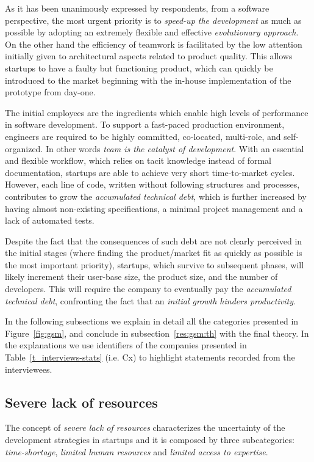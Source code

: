 \documentclass[10pt,journal,letterpaper,compsoc]{IEEEtran}
\begin{document}
As it has been unanimously expressed by respondents, from a software
perspective, the most urgent priority is to \textit{speed-up the development} as
much as possible by adopting an extremely flexible and effective
\textit{evolutionary approach}. On the other hand the efficiency of teamwork is
facilitated by the low attention initially given to architectural aspects
related to product quality. This allows startups to have a faulty but
functioning product, which can quickly be introduced to the market beginning
with the in-house implementation of the prototype from day-one.

The initial employees are the ingredients which enable high levels of
performance in software development. To support a fast-paced production
environment, engineers are required to be highly committed, co-located, 
multi-role, and self-organized. In other words \textit{team is the catalyst of
development}. With an essential and flexible workflow, which relies on tacit
knowledge instead of formal documentation, startups are able to achieve very
short time-to-market cycles. However, each line of code, written without
following structures and processes, contributes to grow the \textit{accumulated
technical debt}, which is further increased by having almost non-existing
specifications, a minimal project management and a lack of automated tests.

Despite the fact that the consequences of such debt are not clearly perceived
in the initial stages (where finding the product/market fit as quickly as
possible is the most important priority), startups, which survive to subsequent
phases, will likely increment their user-base size, the product size, and the
number of developers. This will require the company to eventually pay the
\textit{accumulated technical debt}, confronting the fact that an
\textit{initial growth hinders productivity}.

In the following subsections we explain in detail all the categories presented
in Figure~\ref{fig:gsm}, and conclude in subsection~\ref{res:gsm:th} with the
final theory. In the explanations we use identifiers of the companies presented
in Table~\ref{t_interviews-stats} (i.e. Cx) to highlight statements recorded
from the interviewees.

\subsection{Severe lack of resources}\label{res:gsm:cat7} 
The concept of \textit{severe lack of resources} characterizes the uncertainty 
of the development strategies in startups and it is composed by 
three subcategories: \textit{time-shortage}, \textit{limited human resources} 
and \textit{limited access to expertise}.
\end{document}

